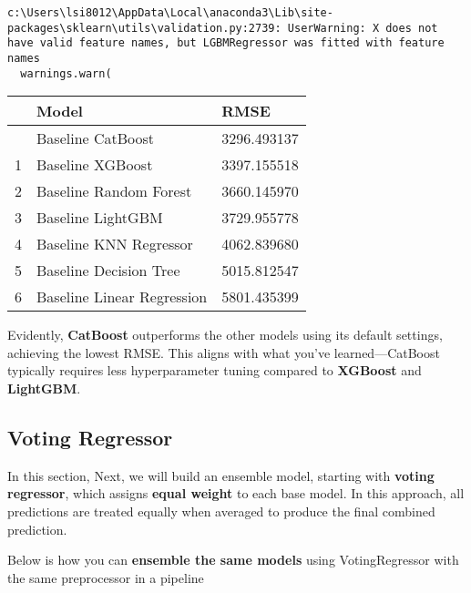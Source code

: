\documentclass[
  letterpaper,
  DIV=11,
  numbers=noendperiod]{scrreprt}
\begin{document}
\begin{verbatim}
c:\Users\lsi8012\AppData\Local\anaconda3\Lib\site-packages\sklearn\utils\validation.py:2739: UserWarning: X does not have valid feature names, but LGBMRegressor was fitted with feature names
  warnings.warn(
\end{verbatim}

\begin{longtable}[]{@{}lll@{}}
\toprule\noalign{}
& Model & RMSE \\
\midrule\noalign{}
\endhead
\bottomrule\noalign{}
\endlastfoot
0 & Baseline CatBoost & 3296.493137 \\
1 & Baseline XGBoost & 3397.155518 \\
2 & Baseline Random Forest & 3660.145970 \\
3 & Baseline LightGBM & 3729.955778 \\
4 & Baseline KNN Regressor & 4062.839680 \\
5 & Baseline Decision Tree & 5015.812547 \\
6 & Baseline Linear Regression & 5801.435399 \\
\end{longtable}

Evidently, \textbf{CatBoost} outperforms the other models using its
default settings, achieving the lowest RMSE. This aligns with what
you've learned---CatBoost typically requires less hyperparameter tuning
compared to \textbf{XGBoost} and \textbf{LightGBM}.

\subsection{Voting Regressor}\label{voting-regressor}

In this section, Next, we will build an ensemble model, starting with
\textbf{voting regressor}, which assigns \textbf{equal weight} to each
base model. In this approach, all predictions are treated equally when
averaged to produce the final combined prediction.

Below is how you can \textbf{ensemble the same models} using
VotingRegressor with the same preprocessor in a pipeline
\end{document}
